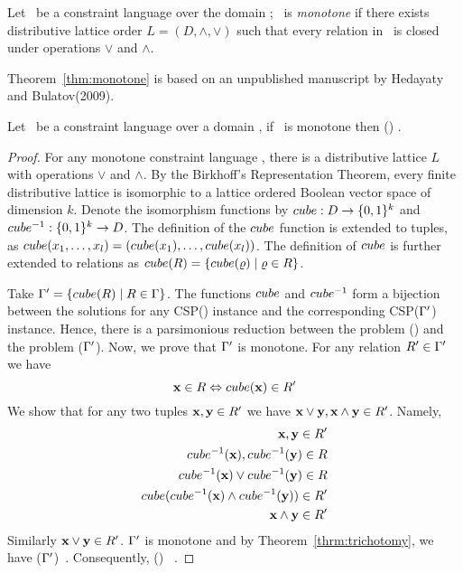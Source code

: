 \begin{defi} 
Let \mrelset\ be a constraint language over the domain \mD; \mrelset\ is \emph{monotone}
if there exists distributive lattice order \(L=(D,\wedge,\vee)\) such that every relation 
in \mrelset\ is closed under operations \(\vee\) and \(\wedge\)\@.
\end{defi}

Theorem~\ref{thm:monotone} is based on an unpublished manuscript by Hedayaty and Bulatov(2009)\@. 
\begin{theorem} \label{thm:monotone}
Let \mrelset\ be a constraint language over a domain \mD, if 
\mrelset\ is monotone then \ccsp(\mrelset) \maple \cbis\@.
\end{theorem}

\begin{proof}
For any monotone constraint language \mrelset, there is a distributive lattice \(L\) with operations
\(\vee\) and \(\wedge\)\@. By the Birkhoff's Representation Theorem, every finite distributive lattice
is isomorphic to a lattice ordered Boolean vector space of dimension \(k\)\@.
Denote the isomorphism functions by \(cube: D \to \{{0,1}\}^k\) and 
\(cube^{-1} : \{{0,1}\}^k\to D\)\@. The definition of the \(cube\) function
is extended to tuples, as \(cube(x_1,\dotsc,x_l)=(cube(x_1),\dotsc,cube(x_l))\)\@.
The definition of \(cube\) is further extended to relations as 
\(cube(R) = \{{cube(\varrho) \mid \varrho \in R}\}\)\@.

Take \(\Gamma'=\{{cube(R)\mid R\in \Gamma}\}\)\@. The functions \(cube\) and
\(cube^{-1}\) form a bijection between the solutions for any CSP(\mrelset) instance and the 
corresponding CSP(\(\Gamma'\)) instance. Hence, there is a parsimonious reduction between 
the problem \ccsp(\mrelset) and the problem \ccsp(\(\Gamma'\)). Now, we prove that
\(\Gamma'\) is monotone. For any relation \(R' \in \Gamma'\) we have
\[\textbf{x} \in R \Leftrightarrow cube(\textbf{x}) \in R'\]
We show that for any two tuples \(\textbf{x},\textbf{y}\in R'\) we have 
\(\textbf{x} \vee \textbf{y}, \textbf{x}\wedge\textbf{y}\in R'\). Namely,
\begin{eqnarray*}
\textbf{x},\textbf{y} \in R'  \\
cube^{-1}(\textbf{x}),cube^{-1}(\textbf{y})\in R  \\
cube^{-1}(\textbf{x}) \vee cube^{-1}(\textbf{y}) \in R  \\
cube(cube^{-1}(\textbf{x})\wedge cube^{-1}(\textbf{y}))\in R' \\
\textbf{x} \wedge \textbf{y} \in R' \\
\end{eqnarray*}
Similarly \(\textbf{x} \vee \textbf{y} \in R'\)\@.
\(\Gamma'\) is monotone and by Theorem~\ref{thrm:trichotomy}, we have 
\ccsp(\(\Gamma'\))\maple\ \cbis\@. Consequently, \ccsp(\mrelset) \maple\ \cbis\@.
\end{proof}

